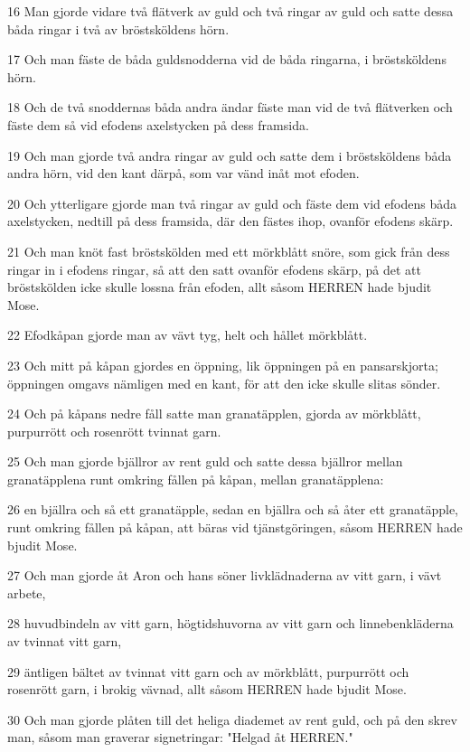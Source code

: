 \par 16 Man gjorde vidare två flätverk av guld och två ringar av guld och satte dessa båda ringar i två av bröstsköldens hörn.
\par 17 Och man fäste de båda guldsnodderna vid de båda ringarna, i bröstsköldens hörn.
\par 18 Och de två snoddernas båda andra ändar fäste man vid de två flätverken och fäste dem så vid efodens axelstycken på dess framsida.
\par 19 Och man gjorde två andra ringar av guld och satte dem i bröstsköldens båda andra hörn, vid den kant därpå, som var vänd inåt mot efoden.
\par 20 Och ytterligare gjorde man två ringar av guld och fäste dem vid efodens båda axelstycken, nedtill på dess framsida, där den fästes ihop, ovanför efodens skärp.
\par 21 Och man knöt fast bröstskölden med ett mörkblått snöre, som gick från dess ringar in i efodens ringar, så att den satt ovanför efodens skärp, på det att bröstskölden icke skulle lossna från efoden, allt såsom HERREN hade bjudit Mose.
\par 22 Efodkåpan gjorde man av vävt tyg, helt och hållet mörkblått.
\par 23 Och mitt på kåpan gjordes en öppning, lik öppningen på en pansarskjorta; öppningen omgavs nämligen med en kant, för att den icke skulle slitas sönder.
\par 24 Och på kåpans nedre fåll satte man granatäpplen, gjorda av mörkblått, purpurrött och rosenrött tvinnat garn.
\par 25 Och man gjorde bjällror av rent guld och satte dessa bjällror mellan granatäpplena runt omkring fållen på kåpan, mellan granatäpplena:
\par 26 en bjällra och så ett granatäpple, sedan en bjällra och så åter ett granatäpple, runt omkring fållen på kåpan, att bäras vid tjänstgöringen, såsom HERREN hade bjudit Mose.
\par 27 Och man gjorde åt Aron och hans söner livklädnaderna av vitt garn, i vävt arbete,
\par 28 huvudbindeln av vitt garn, högtidshuvorna av vitt garn och linnebenkläderna av tvinnat vitt garn,
\par 29 äntligen bältet av tvinnat vitt garn och av mörkblått, purpurrött och rosenrött garn, i brokig vävnad, allt såsom HERREN hade bjudit Mose.
\par 30 Och man gjorde plåten till det heliga diademet av rent guld, och på den skrev man, såsom man graverar signetringar: "Helgad åt HERREN."
